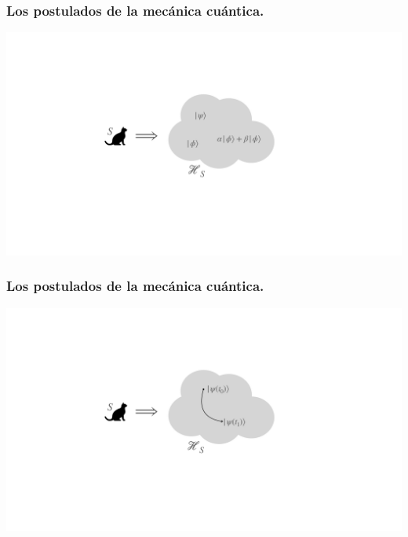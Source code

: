 \documentclass{beamer}
\begin{document}
\begin{frame}
    \frametitle{Los postulados de la mecánica cuántica.}
    \begin{center}
        \includegraphics[scale=0.3]{figs/cats_05.pdf}
    \end{center}

\end{frame}

\begin{frame}
    \frametitle{Los postulados de la mecánica cuántica.}
    \begin{center}
        \includegraphics[scale=0.3]{figs/cats_06.pdf}
    \end{center}

\end{frame}
\end{document}
